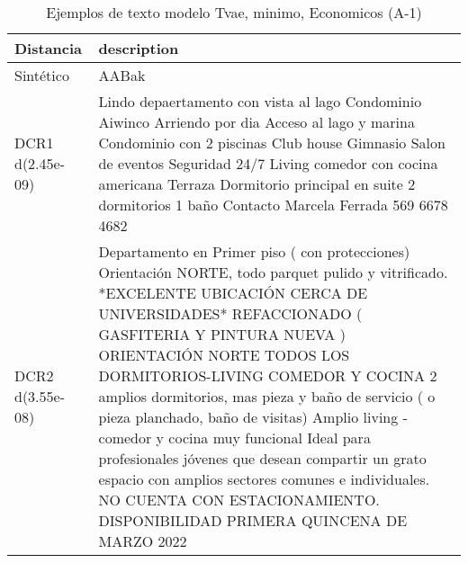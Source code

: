 \begin{table}[H]
\centering
\fontsize{10}{14}\selectfont
\caption{Ejemplos de texto modelo Tvae, minimo, Economicos (A-1)}
\label{table-example-economicos-a-1-tvae-min-text}
\begin{tabular}{|l|m{35em}|}
\hline
\rowcolor[gray]{0.8}
Distancia & description \\
\hline Sintético & AABak \\
\hline DCR1 d(2.45e-09) & Lindo depaertamento con vista al lago Condominio Aiwinco Arriendo por dia  Acceso al lago y marina   Condominio con 2 piscinas Club house Gimnasio Salon de eventos Seguridad 24/7  Living comedor con cocina americana Terraza Dormitorio principal en suite 2 dormitorios  1 ba\~no  Contacto Marcela Ferrada 569 6678 4682 \\
\hline DCR2 d(3.55e-08) & Departamento en Primer piso ( con protecciones) Orientaci\'on NORTE, todo parquet pulido y vitrificado. *EXCELENTE UBICACI\'ON CERCA DE UNIVERSIDADES* REFACCIONADO ( GASFITERIA Y PINTURA NUEVA ) ORIENTACI\'ON NORTE TODOS LOS DORMITORIOS-LIVING COMEDOR Y COCINA 2 amplios dormitorios, mas pieza y ba\~no de servicio ( o pieza planchado, ba\~no de visitas) Amplio living - comedor y cocina muy funcional Ideal para profesionales j\'ovenes que desean compartir un grato espacio con amplios sectores comunes e individuales. NO CUENTA CON ESTACIONAMIENTO. DISPONIBILIDAD PRIMERA QUINCENA DE MARZO 2022 \\
\hline
\end{tabular}
\end{table}
